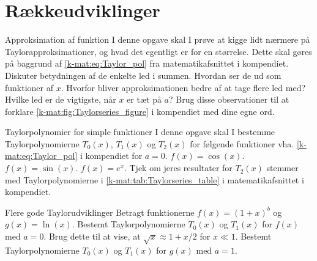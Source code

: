 \section*{Rækkeudviklinger}
\begin{opgave}[1]{Approksimation af funktion}
	I denne opgave skal I prøve at kigge lidt nærmere på Taylorapproksimationer, og hvad det egentligt er for en størrelse. Dette skal gøres på baggrund af \cref{k-mat:eq:Taylor_pol} fra matematikafsnittet i kompendiet.
	\opg Diskuter betydningen af de enkelte led i summen. Hvordan ser de
	ud som funktioner af $x$.
	\opg Hvorfor bliver approksimationen bedre af at tage flere led med?
	\opg Hvilke led er de vigtigste, når $x$ er tæt på $a$?
	\opg Brug disse observationer til at forklare \cref{k-mat:fig:Taylorseries_figure} i kompendiet med dine egne ord.
\end{opgave}	
\begin{opgave}[2]{Taylorpolynomier for simple funktioner}
I denne opgave skal I bestemme Taylorpolynomierne $T_0(x)$, $T_1(x)$ og $T_2(x)$ for følgende funktioner vha. \cref{k-mat:eq:Taylor_pol} i kompendiet for $a=0$.
\opg $f(x) = \cos(x)$.
\opg $f(x) = \sin(x)$.
\opg $f(x) = e^x$.
\opg Tjek om jeres resultater for $T_2(x)$ stemmer med Taylorpolynomierne i \cref{k-mat:tab:Taylorseries_table} i matematikafsnittet i kompendiet. 
\end{opgave}
\begin{opgave}[3]{Flere gode Taylorudviklinger}
Betragt funktionerne $f(x) = (1+x)^{b}$ og $g(x) = \ln(x)$.
\opg Bestemt Taylorpolynomierne $T_0(x)$ og $T_1(x)$ for $f(x)$ med $a=0$.
\opg Brug dette til at vise, at $\sqrt{x} \approx 1+x/2$ for $x\ll1$.
\opg Bestemt Taylorpolynomierne $T_0(x)$ og $T_1(x)$ for $g(x)$ med $a=1$.
\end{opgave}